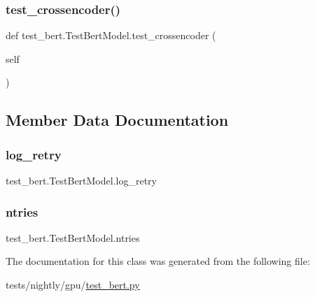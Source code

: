\subsubsection{\texorpdfstring{test\+\_\+crossencoder()}{test\_crossencoder()}}
{\footnotesize\ttfamily def test\+\_\+bert.\+Test\+Bert\+Model.\+test\+\_\+crossencoder (\begin{DoxyParamCaption}\item[{}]{self }\end{DoxyParamCaption})}



\subsection{Member Data Documentation}
\mbox{\label{classtest__bert_1_1TestBertModel_af6b428797cdbe20ca87f4b1379235347}} 
\subsubsection{\texorpdfstring{log\+\_\+retry}{log\_retry}}
{\footnotesize\ttfamily test\+\_\+bert.\+Test\+Bert\+Model.\+log\+\_\+retry\hspace{0.3cm}{\ttfamily [static]}}

\mbox{\label{classtest__bert_1_1TestBertModel_af62ecae2b9496780476aae9732a03d26}} 
\subsubsection{\texorpdfstring{ntries}{ntries}}
{\footnotesize\ttfamily test\+\_\+bert.\+Test\+Bert\+Model.\+ntries\hspace{0.3cm}{\ttfamily [static]}}



The documentation for this class was generated from the following file\+:\begin{DoxyCompactItemize}
\item 
tests/nightly/gpu/\hyperlink{test__bert_8py}{test\+\_\+bert.\+py}\end{DoxyCompactItemize}
